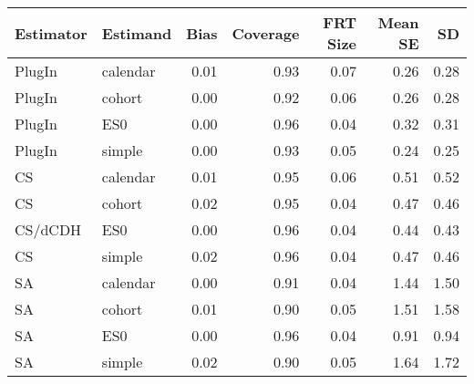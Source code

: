 \captionsetup[table]{labelformat=empty,skip=1pt}
\begin{longtable}{llrrrrr}
\toprule
Estimator & Estimand & Bias & Coverage & FRT Size & Mean SE & SD \\ 
\midrule
PlugIn & calendar & 0.01 & 0.93 & 0.07 & 0.26 & 0.28 \\ 
PlugIn & cohort & 0.00 & 0.92 & 0.06 & 0.26 & 0.28 \\ 
PlugIn & ES0 & 0.00 & 0.96 & 0.04 & 0.32 & 0.31 \\ 
PlugIn & simple & 0.00 & 0.93 & 0.05 & 0.24 & 0.25 \\ 
CS & calendar & 0.01 & 0.95 & 0.06 & 0.51 & 0.52 \\ 
CS & cohort & 0.02 & 0.95 & 0.04 & 0.47 & 0.46 \\ 
CS/dCDH & ES0 & 0.00 & 0.96 & 0.04 & 0.44 & 0.43 \\ 
CS & simple & 0.02 & 0.96 & 0.04 & 0.47 & 0.46 \\ 
SA & calendar & 0.00 & 0.91 & 0.04 & 1.44 & 1.50 \\ 
SA & cohort & 0.01 & 0.90 & 0.05 & 1.51 & 1.58 \\ 
SA & ES0 & 0.00 & 0.96 & 0.04 & 0.91 & 0.94 \\ 
SA & simple & 0.02 & 0.90 & 0.05 & 1.64 & 1.72 \\ 
 \bottomrule
\end{longtable}


